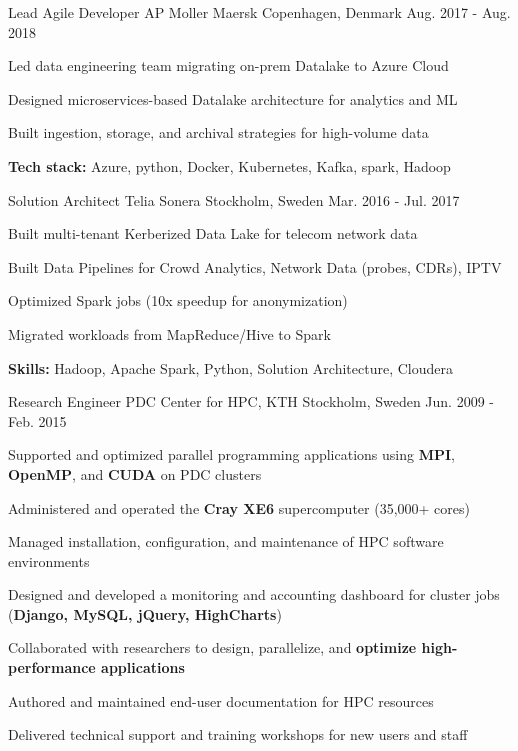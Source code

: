 \begin{cventries}
\cventry
{Lead Agile Developer} %
{AP Moller Maersk} %
{Copenhagen, Denmark} %
{Aug. 2017 - Aug. 2018} %
{ %
\begin{cvitems}
\item Led data engineering team migrating on-prem Datalake to Azure Cloud
\item Designed microservices-based Datalake architecture for analytics and ML
\item Built ingestion, storage, and archival strategies for high-volume data
\item \textbf{Tech stack:} Azure, python, Docker, Kubernetes, Kafka, spark, Hadoop
\end{cvitems}
}



\cventry
{Solution Architect} %
{Telia Sonera} %
{Stockholm, Sweden} %
{Mar. 2016 - Jul. 2017} %
{ %
\begin{cvitems}
\item Built multi-tenant Kerberized Data Lake for telecom network data
\item Built Data Pipelines for Crowd Analytics, Network Data (probes, CDRs), IPTV 
\item Optimized Spark jobs (10x speedup for anonymization)
\item Migrated workloads from MapReduce/Hive to Spark
\item \textbf{Skills:} Hadoop, Apache Spark, Python, Solution Architecture, Cloudera
\end{cvitems}
}


\cventry
{Research Engineer} %
{PDC Center for HPC, KTH} %
{Stockholm, Sweden} %
{Jun. 2009 - Feb. 2015} %
{ %
\begin{cvitems}
\item Supported and optimized parallel programming applications using \textbf{MPI}, \textbf{OpenMP}, and \textbf{CUDA} on PDC clusters  
\item Administered and operated the \textbf{Cray XE6} supercomputer (35,000+ cores)
\item Managed installation, configuration, and maintenance of HPC software environments
\item Designed and developed a monitoring and accounting dashboard for cluster jobs (\textbf{Django, MySQL, jQuery, HighCharts})
\item Collaborated with researchers to design, parallelize, and \textbf{optimize high-performance applications}
\item Authored and maintained end-user documentation for HPC resources
\item Delivered technical support and training workshops for new users and staff
\end{cvitems}
}


\end{cventries}
